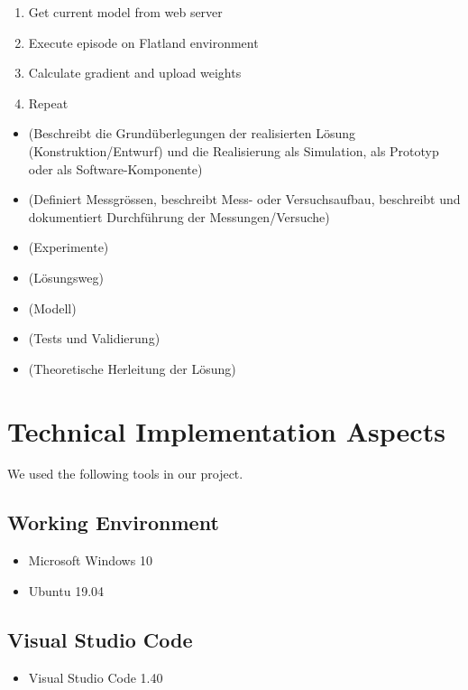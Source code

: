 \begin{enumerate}
	\item Get current model from web server
	\item Execute episode on Flatland environment
	\item Calculate gradient and upload weights
	\item Repeat
\end{enumerate}





\begin{itemize}
\item (Beschreibt die Grundüberlegungen der realisierten Lösung (Konstruktion/Entwurf) und die Realisierung als Simulation, als Prototyp oder als Software-Komponente)
\item (Definiert Messgrössen, beschreibt Mess- oder Versuchsaufbau, beschreibt und dokumentiert Durchführung der Messungen/Versuche)
\item (Experimente)
\item (Lösungsweg)
\item (Modell)
\item (Tests und Validierung)
\item (Theoretische Herleitung der Lösung)
\end{itemize}

\section{Technical Implementation Aspects}\label{software}
We used the following tools in our project.

\subsection*{Working Environment}\label{os}
\begin{itemize}
	\item Microsoft Windows 10
	\item Ubuntu 19.04
\end{itemize}

\subsection*{Visual Studio Code}\label{vsc}
\begin{itemize}
	\item Visual Studio Code 1.40
\end{itemize}

